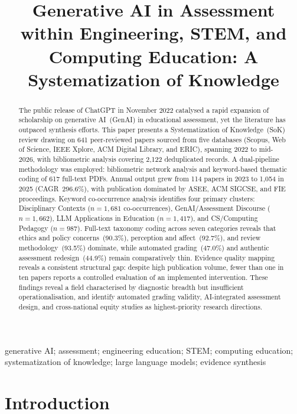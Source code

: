 \documentclass[conference]{IEEEtran}
\title{Generative AI in Assessment within Engineering, STEM, and Computing Education:
       A Systematization of Knowledge}
\author{%
  \IEEEauthorblockN{Sian Lerk Lau}
  \IEEEauthorblockA{%
    \textit{School of Mathematical and Computer Sciences}\\
    Sunway University\\
    Petaling Jaya, Malaysia\\
    sianlunl@sunway.edu.my
  }
}
\begin{document}
\maketitle

\begin{abstract}
The public release of ChatGPT in November 2022 catalysed a rapid expansion of scholarship on
generative AI~(GenAI) in educational assessment, yet the literature has outpaced synthesis
efforts. This paper presents a Systematization of Knowledge~(SoK) review drawing on 641
peer-reviewed papers sourced from five databases (Scopus, Web of Science, IEEE Xplore, ACM
Digital Library, and ERIC), spanning 2022 to mid-2026, with bibliometric analysis covering
2,122 deduplicated records. A dual-pipeline methodology was employed: bibliometric network
analysis and keyword-based thematic coding of 617 full-text PDFs. Annual output grew from 114
papers in 2023 to 1,054 in 2025 (CAGR~296.6\%), with publication dominated by ASEE, ACM
SIGCSE, and FIE proceedings. Keyword co-occurrence analysis identifies four primary clusters:
Disciplinary Contexts ($n{=}1{,}681$ co-occurrences), GenAI/Assessment Discourse
($n{=}1{,}662$), LLM Applications in Education ($n{=}1{,}417$), and CS/Computing Pedagogy
($n{=}987$). Full-text taxonomy coding across seven categories reveals that ethics and policy
concerns~(90.3\%), perception and affect~(92.7\%), and review methodology~(93.5\%) dominate,
while automated grading~(47.0\%) and authentic assessment redesign~(44.9\%) remain
comparatively thin. Evidence quality mapping reveals a consistent structural gap: despite high
publication volume, fewer than one in ten papers reports a controlled evaluation of an
implemented intervention. These findings reveal a field characterised by diagnostic breadth
but insufficient operationalisation, and identify automated grading validity, AI-integrated
assessment design, and cross-national equity studies as highest-priority research directions.
\end{abstract}

\begin{IEEEkeywords}
generative AI; assessment; engineering education; STEM; computing education; systematization
of knowledge; large language models; evidence synthesis
\end{IEEEkeywords}

\section{Introduction}
\end{document}
